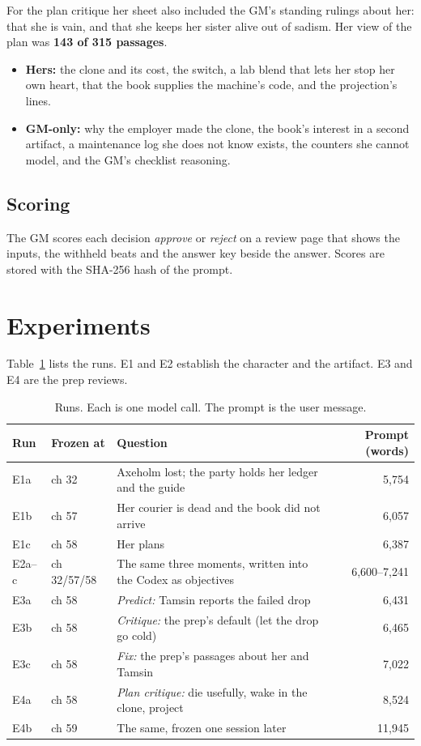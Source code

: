 \documentclass[11pt]{article}
\begin{document}
For the plan critique her sheet also included the GM's standing rulings about her: that she
is vain, and that she keeps her sister alive out of sadism. Her view of the plan was
\textbf{143 of 315 passages}.
\begin{itemize}[nosep]
\item \textbf{Hers:} the clone and its cost, the switch, a lab blend that lets her stop her
own heart, that the book supplies the machine's code, and the projection's lines.
\item \textbf{GM-only:} why the employer made the clone, the book's interest in a second
artifact, a maintenance log she does not know exists, the counters she cannot model, and
the GM's checklist reasoning.
\end{itemize}

\subsection{Scoring}

The GM scores each decision \emph{approve} or \emph{reject} on a review page that shows the
inputs, the withheld beats and the answer key beside the answer. Scores are stored with the
SHA-256 hash of the prompt.

\section{Experiments}
\label{sec:experiments}

Table~\ref{tab:runs} lists the runs. E1 and E2 establish the character and the artifact.
E3 and E4 are the prep reviews.

\begin{table}[t]
\centering
\small
\begin{tabularx}{\linewidth}{llXr}
\toprule
Run & Frozen at & Question & Prompt (words) \\
\midrule
E1a & ch 32 & Axeholm lost; the party holds her ledger and the guide & 5{,}754 \\
E1b & ch 57 & Her courier is dead and the book did not arrive & 6{,}057 \\
E1c & ch 58 & Her plans & 6{,}387 \\
E2a--c & ch 32/57/58 & The same three moments, written into the Codex as objectives & 6{,}600--7{,}241 \\
E3a & ch 58 & \emph{Predict:} Tamsin reports the failed drop & 6{,}431 \\
E3b & ch 58 & \emph{Critique:} the prep's default (let the drop go cold) & 6{,}465 \\
E3c & ch 58 & \emph{Fix:} the prep's passages about her and Tamsin & 7{,}022 \\
E4a & ch 58 & \emph{Plan critique:} die usefully, wake in the clone, project & 8{,}524 \\
E4b & ch 59 & The same, frozen one session later & 11{,}945 \\
\bottomrule
\end{tabularx}
\caption{Runs. Each is one model call. The prompt is the user message.}
\label{tab:runs}
\end{table}
\end{document}
